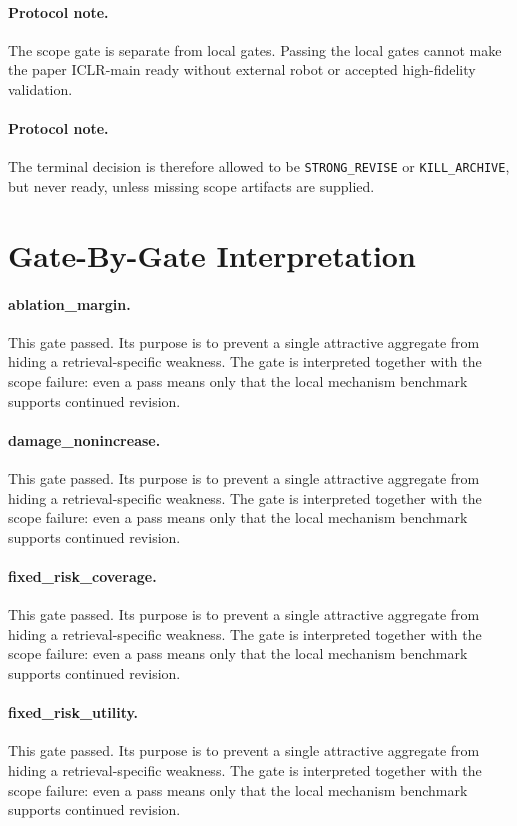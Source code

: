 \documentclass{article}
\begin{document}
\paragraph{Protocol note.} The scope gate is separate from local gates. Passing the local gates cannot make the paper ICLR-main ready without external robot or accepted high-fidelity validation.
\paragraph{Protocol note.} The terminal decision is therefore allowed to be \texttt{STRONG\_REVISE} or \texttt{KILL\_ARCHIVE}, but never ready, unless missing scope artifacts are supplied.
\section{Gate-By-Gate Interpretation}
\paragraph{ablation\_margin.} This gate passed. Its purpose is to prevent a single attractive aggregate from hiding a retrieval-specific weakness. The gate is interpreted together with the scope failure: even a pass means only that the local mechanism benchmark supports continued revision.
\paragraph{damage\_nonincrease.} This gate passed. Its purpose is to prevent a single attractive aggregate from hiding a retrieval-specific weakness. The gate is interpreted together with the scope failure: even a pass means only that the local mechanism benchmark supports continued revision.
\paragraph{fixed\_risk\_coverage.} This gate passed. Its purpose is to prevent a single attractive aggregate from hiding a retrieval-specific weakness. The gate is interpreted together with the scope failure: even a pass means only that the local mechanism benchmark supports continued revision.
\paragraph{fixed\_risk\_utility.} This gate passed. Its purpose is to prevent a single attractive aggregate from hiding a retrieval-specific weakness. The gate is interpreted together with the scope failure: even a pass means only that the local mechanism benchmark supports continued revision.
\end{document}
